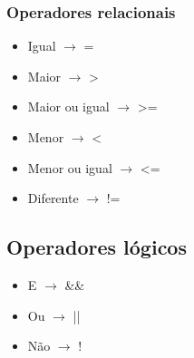 \documentclass[12pt,a4paper]{article} %
\begin{document}
\subsubsection{Operadores relacionais}
\begin{itemize}
\item Igual $\rightarrow$ =
\item Maior $\rightarrow$ >
\item Maior ou igual $\rightarrow$ >=
\item Menor $\rightarrow$ <
\item Menor ou igual $\rightarrow$ <=
\item Diferente $\rightarrow$ !=
\end{itemize}

\subsection{Operadores lógicos}
\begin{itemize}
\item E $\rightarrow$ \&\&
\item Ou $\rightarrow$ ||
\item Não $\rightarrow$ !
\end{itemize}
\end{document}
